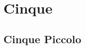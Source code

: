 \documentclass{article}
\begin{document}
{\vspace*{.5cm}} 
\section{Cinque}

\subsection{Cinque Piccolo}

{ }

%
%

%

%
\end{document}
